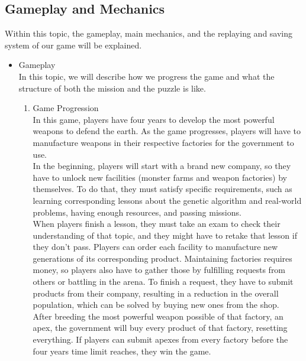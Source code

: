 \documentclass[12pt,oneside,openright,a4paper]{cpe-english-project}
\begin{document}
\subsection{Gameplay and Mechanics}
Within this topic, the gameplay, main mechanics, and the replaying and saving system of our game will be explained.

\begin{itemize}
\item Gameplay \\
In this topic, we will describe how we progress the game and what the structure of both the mission and the puzzle is like.
	\begin{enumerate}
	\item Game Progression \\
	In this game, players have four years to develop the most powerful weapons to defend the earth. As the game progresses, players will have to manufacture weapons in their respective factories for the government to use. \\
	In the beginning, players will start with a brand new company, so they have to unlock new facilities (monster farms and weapon factories) by themselves. To do that, they must satisfy specific requirements, such as learning corresponding lessons about the genetic algorithm and real-world problems, having enough resources, and passing missions. \\
	When players finish a lesson, they must take an exam to check their understanding of that topic, and they might have to retake that lesson if they don't pass. Players can order each facility to manufacture new generations of its corresponding product.
Maintaining factories requires money, so players also have to gather those by fulfilling requests from others or battling in the arena. To finish a request, they have to submit products from their company, resulting in a reduction in the overall population, which can be solved by buying new ones from the shop. \\
	After breeding the most powerful weapon possible of that factory, an apex, the government will buy every product of that factory, resetting everything. If players can submit apexes from every factory before the four years time limit reaches, they win the game.


\end{enumerate}
\end{itemize}
\end{document}
